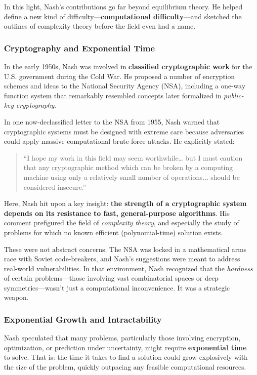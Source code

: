 In this light, Nash’s contributions go far beyond equilibrium theory. He helped define a new kind of difficulty—\textbf{computational difficulty}—and sketched the outlines of complexity theory before the field even had a name.

\subsubsection{Cryptography and Exponential Time}

In the early 1950s, Nash was involved in \textbf{classified cryptographic work} for the U.S. government during the Cold War. He proposed a number of encryption schemes and ideas to the National Security Agency (NSA), including a one-way function system that remarkably resembled concepts later formalized in \textit{public-key cryptography}.

In one now-declassified letter to the NSA from 1955, Nash warned that cryptographic systems must be designed with extreme care because adversaries could apply massive computational brute-force attacks. He explicitly stated:

\begin{quote}
``I hope my work in this field may seem worthwhile… but I must caution that any cryptographic method which can be broken by a computing machine using only a relatively small number of operations... should be considered insecure.''
\end{quote}

Here, Nash hit upon a key insight: \textbf{the strength of a cryptographic system depends on its resistance to fast, general-purpose algorithms}. His comment prefigured the field of \textit{complexity theory}, and especially the study of problems for which no known efficient (polynomial-time) solution exists.

These were not abstract concerns. The NSA was locked in a mathematical arms race with Soviet code-breakers, and Nash's suggestions were meant to address real-world vulnerabilities. In that environment, Nash recognized that the \textit{hardness} of certain problems—those involving vast combinatorial spaces or deep symmetries—wasn’t just a computational inconvenience. It was a strategic weapon.

\subsubsection{Exponential Growth and Intractability}

Nash speculated that many problems, particularly those involving encryption, optimization, or prediction under uncertainty, might require \textbf{exponential time} to solve. That is: the time it takes to find a solution could grow explosively with the size of the problem, quickly outpacing any feasible computational resources.

